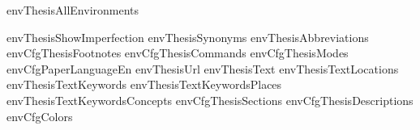 \startenvironment envThesisAllEnvironments

\environment envThesisShowImperfection
\environment envThesisSynonyms
\environment envThesisAbbreviations
\environment envCfgThesisFootnotes
\environment envCfgThesisCommands
\environment envCfgThesisModes
\environment envCfgPaperLanguageEn
\environment envThesisUrl
\environment envThesisText
\environment envThesisTextLocations
\environment envThesisTextKeywords
\environment envThesisTextKeywordsPlaces
\environment envThesisTextKeywordsConcepts
\environment envCfgThesisSections
\environment envCfgThesisDescriptions
\environment envCfgColors

\stopenvironment